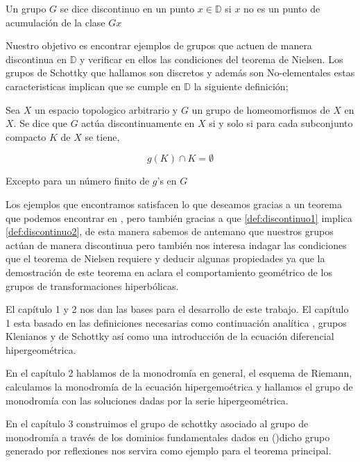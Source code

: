 \begin{resumen}
\begin{defn}
\label{def:discontinuo2}
Un grupo $G$ se dice discontinuo en un punto $x \in \mathbb{D}$ si $x$ no es un punto de acumulaci\'on de la clase $Gx$
\end{defn}

Nuestro objetivo es encontrar ejemplos de grupos que actuen de manera discontinua en $\mathbb{D}$ y verificar en ellos las condiciones del teorema de Nielsen. Los grupos de Schottky que hallamos son discretos y adem\'as son No-elementales estas caracteristicas implican que se cumple en $\mathbb{D}$ la siguiente definici\'on;



\begin{defn}
\label{def:discontinuo1}
Sea $X$ un espacio topologico arbitrario y $G$ un grupo de homeomorfismos de $X$ en $X$. Se dice que $G$ act\'ua discontinuamente en $X$ si y solo si para cada subconjunto compacto $K$ de $X$ se tiene,

$$g(K) \cap K = \emptyset $$

Excepto para un n\'umero finito de $g$'s en $G$
\end{defn}

Los ejemplos que encontramos satisfacen lo que deseamos gracias a un teorema que podemos encontrar en  \cite{Beardon}, pero tambi\'en gracias a que \ref{def:discontinuo1} implica \ref{def:discontinuo2}, de esta manera sabemos de antemano que nuestros grupos act\'uan de manera discontinua pero tambi\'en nos interesa indagar las condiciones que el teorema de Nielsen requiere y deducir algunas propiedades ya que la demostraci\'on de este teorema en \cite{Nielsen} aclara el comportamiento geom\'etrico de los grupos de transformaciones hiperb\'olicas.

El cap\'itulo 1 y 2 nos dan las bases para el desarrollo de este trabajo. El cap\'itulo 1 esta basado en las definiciones necesarias como continuación anal\'itica , grupos Klenianos y de Schottky as\'i como una  introducción de la ecuación diferencial hipergeom\'etrica.

En el cap\'itulo 2 hablamos de la monodrom\'ia en general, el esquema de Riemann, calculamos la monodrom\'ia de la ecuaci\'on hipergemo\'etrica y hallamos el grupo de monodrom\'ia con las soluciones dadas por la serie hipergeom\'etrica.


En el cap\'itulo 3 construimos el grupo de schottky asociado al grupo de monodrom\'ia a trav\'es de los dominios fundamentales dados en (\cite{Masaaki})dicho grupo generado por reflexiones nos servira como ejemplo para el teorema principal.


\end{resumen}
